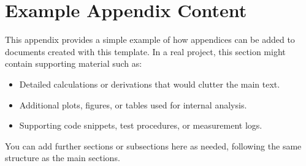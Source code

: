 %
%

\section{Example Appendix Content}
\label{app:exampleAppendix}

This appendix provides a simple example of how appendices can be added to
documents created with this template. In a real project, this section might
contain supporting material such as:

\begin{itemize}
  \item Detailed calculations or derivations that would clutter the main text.
  \item Additional plots, figures, or tables used for internal analysis.
  \item Supporting code snippets, test procedures, or measurement logs.
\end{itemize}

You can add further sections or subsections here as needed, following the same
structure as the main sections.

